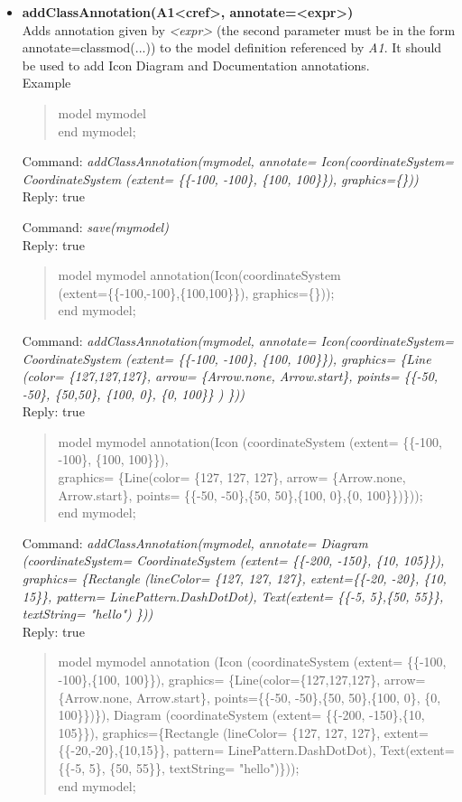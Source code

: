 \documentclass[11pt,a4paper,oneside,english]{book}
\newenvironment{modelicaExamples}{\begin{itemize}}{\end{itemize}}
\newcommand{\api}[2]{\item \textbf{#1} \\ #2}
\newcommand{\tab}{\hspace{2em}}
\newcommand{\command}[1]{Command: \textit{#1}\\}
\newcommand{\reply}[1]{Reply: #1}
\newcommand{\functionex}[2]{\begin{singlespace} \command{#1} \reply{#2} \end{singlespace}}
\newcommand{\examples}{Example}
\newenvironment{mocode}{\begin{verse}\begin{singlespace}\begin{scriptsize}\ttfamily}{\end{scriptsize}\end{singlespace}\end{verse}}
\begin{document}
\begin{modelicaExamples}
{		}



		\api{addClassAnnotation(A1<cref>, annotate=<expr>)}{Adds annotation given by \textit{<expr>} (the second parameter must be in the form annotate=classmod(...)) to the model definition referenced by \textit{A1}. It should be used to add Icon Diagram and Documentation annotations.\\
		\examples
		\begin{mocode}
		model mymodel\\
		end mymodel;
		\end{mocode}
		\functionex{addClassAnnotation(mymodel, annotate= Icon(coordinateSys\-tem= CoordinateSystem (extent= \{\{-100, -100\}, \{100, 100\}\}), graphics=\{\}))}
		{true}

		\functionex{save(mymodel)}
		{true}

		\begin{mocode}
		model mymodel annotation(Icon(coordinateSystem\\
\tab (extent=\{\{-100,-100\},\{100,100\}\}), graphics=\{\}));\\
		end mymodel;
		\end{mocode}

		\functionex{addClassAnnotation(mymodel, annotate= Icon(coordinateSys\-tem= CoordinateSystem (extent= \{\{-100, -100\}, \{100, 100\}\}), graphics= \{Line (color= \{127,127,127\}, arrow= \{Arrow.none, Arrow.sta\-rt\}, points= \{\{-50, -50\}, \{50,50\}, \{100, 0\}, \{0, 100\}\} ) \}))}
		{true}

		\begin{mocode}
		model mymodel annotation(Icon (coordinateSystem (extent= \{\{-100, -100\}, \{100, 100\}\}),\\
\tab graphics= \{Line(color= \{127, 127, 127\}, arrow= \{Arrow.none, Arrow.st\-art\}, points= \{\{-50, -50\},\{50, 50\},\{100, 0\},\{0, 100\}\})\}));\\
		end mymodel;
		\end{mocode}

		\functionex{addClassAnnotation(mymodel, annotate= Diagram (coordinateSystem= CoordinateSystem (extent= \{\{-200, -150\}, \{10, 105\}\}), graphics= \{Rectangle (lineColor= \{127, 127, 127\}, extent=\{\{-20, -20\}, \{10, 15\}\}, pattern= LinePattern.DashDotDot), Text(extent= \{\{-5, 5\},\{50, 55\}\}, textString= "hello") \}))}
		{true}

		\begin{mocode}
		model mymodel
  		annotation (Icon (coordinateSystem (extent= \{\{-100, -100\},\{100, 100\}\}), graphics= \{Line(color=\{127,127,127\}, arrow=\{Arrow.none, Arrow.sta\-rt\}, points=\{\{-50, -50\},\{50, 50\},\{100, 0\}, \{0, 100\}\})\}), Diagram (coordinateSys\-tem (extent= \{\{-200, -150\},\{10, 105\}\}), graphics=\{Rectangle (lineColor= \{127, 127, 127\}, extent=\{\{-20,-20\},\{10,15\}\}, pattern= LinePattern.Dash\-DotDot), Text(extent= \{\{-5, 5\}, \{50, 55\}\}, textString= "hello")\}));\\
		end mymodel;
		\end{mocode}

}
\end{modelicaExamples}
\end{document}
